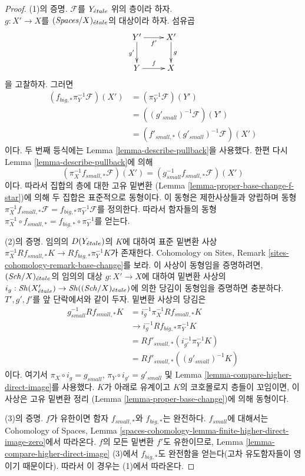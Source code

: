 \begin{proof}
(1)의 증명. $\mathcal{F}$를 $Y_{\acute{e}tale}$ 위의 층이라 하자.\\
$g : X' \to X$를 $(\textit{Spaces}/X)_{\acute{e}tale}$의 대상이라 하자.
섬유곱
$$
\xymatrix{
Y' \ar[r]_{f'} \ar[d]_{g'} & X' \ar[d]^g \\
Y \ar[r]^f & X
}
$$
을 고찰하자. 그러면
$$
\begin{aligned}
(f_{big, *}\pi_Y^{-1}\mathcal{F})(X')
&= (\pi_Y^{-1}\mathcal{F})(Y') \\
&= ((g'_{small})^{-1}\mathcal{F})(Y') \\
&= (f'_{small, *}(g'_{small})^{-1}\mathcal{F})(X')
\end{aligned}
$$
이다. 두 번째 등식에는 Lemma \ref{lemma-describe-pullback}을 사용했다.
한편 다시 Lemma \ref{lemma-describe-pullback}에 의해
$$
(\pi_X^{-1}f_{small, *}\mathcal{F})(X') =
(g_{small}^{-1}f_{small, *}\mathcal{F})(X')
$$
이다. 따라서 집합의 층에 대한 고유 밑변환
(Lemma \ref{lemma-proper-base-change-f-star})에 의해 두 집합은 표준적으로
동형이다. 이 동형은 제한사상들과 양립하며 동형
$\pi_X^{-1}f_{small, *}\mathcal{F} = f_{big, *}\pi_Y^{-1}\mathcal{F}$를
정의한다. 따라서 함자들의 동형
$\pi_X^{-1} \circ f_{small, *} = f_{big, *} \circ \pi_Y^{-1}$를 얻는다.

\medskip\noindent
(2)의 증명. 임의의 $D(Y_{\acute{e}tale})$의 $K$에 대하여 표준 밑변환 사상\\
$\pi_X^{-1}Rf_{small, *}K \to Rf_{big, *}\pi_Y^{-1}K$가 존재한다.
Cohomology on Sites, Remark
\ref{sites-cohomology-remark-base-change}를 보라.
이 사상이 동형임을 증명하려면, $(\mathit{Sch}/X)_{\acute{e}tale}$의 임의의 대상
$g : X' \to X$에 대하여 밑변환 사상의\\
$i_g : \mathop{\mathit{Sh}}\nolimits(X'_{\acute{e}tale}) \to \mathop{\mathit{Sh}}\nolimits((\mathit{Sch}/X)_{\acute{e}tale})$에 의한 당김이
동형임을 증명하면 충분하다.
$T', g', f'$를 앞 단락에서와 같이 두자.
밑변환 사상의 당김은
\begin{align*}
g_{small}^{-1}Rf_{small, *}K
& =
i_g^{-1}\pi_X^{-1}Rf_{small, *}K \\
& \to
i_g^{-1}Rf_{big, *}\pi_Y^{-1}K \\
& =
Rf'_{small, *}(i_{g'}^{-1}\pi_Y^{-1}K) \\
& =
Rf'_{small, *}((g'_{small})^{-1}K)
\end{align*}
이다. 여기서 $\pi_X \circ i_g = g_{small}$,
$\pi_Y \circ i_{g'} = g'_{small}$ 및
Lemma \ref{lemma-compare-higher-direct-image}를 사용했다.
$K$가 아래로 유계이고 $K$의 코호몰로지 층들이 꼬임이면,
이 사상은 고유 밑변환 정리
(Lemma \ref{lemma-proper-base-change})에 의해 동형이다.

\medskip\noindent
(3)의 증명. $f$가 유한이면 함자 $f_{small, *}$와 $f_{big, *}$는
완전하다. $f_{small}$에 대해서는 Cohomology of Spaces, Lemma
\ref{spaces-cohomology-lemma-finite-higher-direct-image-zero}에서 따라온다.
$f$의 모든 밑변환 $f'$도 유한이므로, Lemma
\ref{lemma-compare-higher-direct-image} (3)에서 $f_{big, *}$도
완전함을 얻는다(고차 유도함자들이 영이기 때문이다).
따라서 이 경우는 (1)에서 따라온다.
\end{proof}


